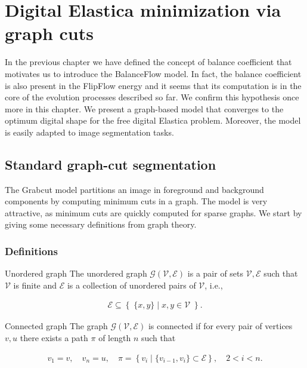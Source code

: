\chapter{Digital Elastica minimization via graph cuts}
\label{chapter:graphflow}

In the previous chapter we have defined the concept of balance coefficient that motivates us to introduce the BalanceFlow model. In fact, the balance coefficient is also present in the FlipFlow energy and it seems that its computation is in the core of the evolution processes described so far. We confirm this hypothesis once more in this chapter. We present a graph-based model that converges to the optimum digital shape for the free digital Elastica problem. Moreover, the model is easily adapted to image segmentation tasks.

\section{Standard graph-cut segmentation}
The Grabcut model \cite{rother04grabcut} partitions an image in foreground and background components by computing minimum cuts in a graph. The model is very attractive, as minimum cuts are quickly computed for sparse graphs. We start by giving some necessary definitions from graph theory.

\subsection{Definitions}

\begin{definition}{Unordered graph}
The unordered graph $\mathcal{G}(\mathcal{V},\mathcal{E})$ is a pair of sets $\mathcal{V},\mathcal{E}$ such that $\mathcal{V}$ is finite and $\mathcal{E}$ is a collection of unordered pairs of $\mathcal{V}$, i.e., 

\begin{align*}
\mathcal{E} \subseteq  \left\{ \; \{x,y\} \; | \; x,y \in \mathcal{V} \; \right\}.
\end{align*}

\end{definition}

\begin{definition}{Connected graph}
The graph $\mathcal{G}(\mathcal{V},\mathcal{E})$ is connected if for every pair of vertices $v,u$ there exists a path $\pi$ of length $n$ such that

\begin{align*}
	v_1 = v, \quad v_n = u, \quad 	\pi = \left\{ v_i \; | \; \{v_{i-1},v_{i}\} \subset \mathcal{E} \right\},\quad  2<i<n.
\end{align*}
\end{definition}

